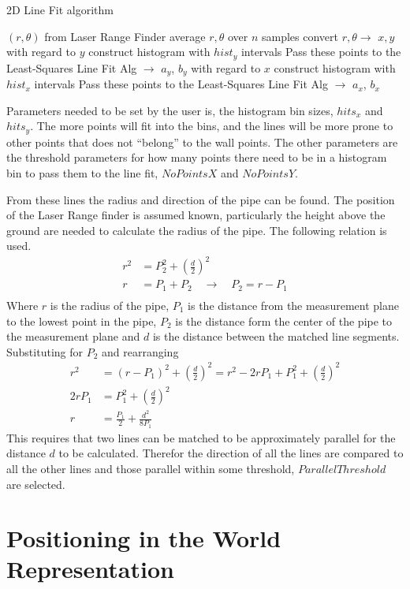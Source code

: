 \begin{algorithm}[htbp]
    \caption{2D Line Fit algorithm}
    \label{chap5:alg-2dlinefit}
    \begin{algorithmic}
        \REQUIRE $(r, \theta)$ from Laser Range Finder
        \STATE average $r, \theta$ over $n$ samples
        \STATE convert $r, \theta \rightarrow$ $x, y$ 
        \STATE with regard to $y$ construct histogram with $hist_y$ intervals
                \STATE Pass these points to the Least-Squares Line Fit Alg $\rightarrow$ $a_y$, $b_y$
            \ENDIF
        \ENDFOR
        \STATE with regard to $x$ construct histogram with $hist_x$ intervals
                \STATE Pass these points to the Least-Squares Line Fit Alg $\rightarrow$ $a_x$, $b_x$
            \ENDIF
        \ENDFOR
    \end{algorithmic}
\end{algorithm}
Parameters needed to be set by the user is, the histogram bin sizes, $hits_x$ and
$hits_y$. The more points will fit into the bins, and the lines will be more prone to
other points that does not ``belong'' to the wall points. The other parameters are the
threshold parameters for how many points there need to be in a histogram bin to pass them
to the line fit, $NoPointsX$ and $NoPointsY$.

From these lines the radius and direction of the pipe can be found. The position of the
Laser Range finder is assumed known, particularly the height above the ground are needed
to calculate the radius of the pipe. The following relation is used.
\begin{equation}
    \begin{aligned}
        r^2 &= P_2^2 + (\frac{d}{2})^2 \\
        r &= P_1 + P_2  \quad \rightarrow \quad P_2 = r - P_1\\
    \end{aligned}
\end{equation}
Where $r$ is the radius of the pipe, $P_1$ is the distance from the measurement plane to
the lowest point in the pipe, $P_2$ is the distance form the center of the pipe to the
measurement plane and $d$ is the distance between the matched line segments. Substituting
for $P_2$ and rearranging
\begin{equation}
    \begin{aligned}
        r^2& = (r - P_1)^2 + (\frac{d}{2})^2 = r^2 - 2 r P_1 + P_1^2 + (\frac{d}{2})^2 \\
        2 r P_1 &= P_1^2 + (\frac{d}{2})^2 \\
        r &= \frac{P_1}{2} + \frac{d^2}{8 P_1}
    \end{aligned}
\end{equation}
This requires that two lines can be matched to be approximately parallel for the distance
$d$ to be calculated. Therefor the direction of all the lines are compared to all the
other lines and those parallel within some threshold, $ParallelThreshold$ are selected. 

\section{Positioning in the World Representation}




